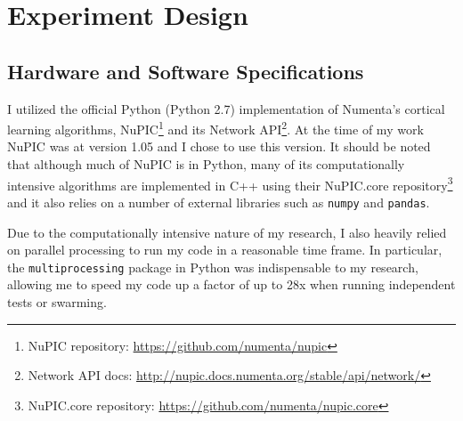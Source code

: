 \documentclass[oneside,12pt,openany]{book}
\begin{document}
	
	
    
    
    
    
    
	
	
	\chapter{Experiment Design}
	
	\section{Hardware and Software Specifications}
	
	I utilized the official Python (Python 2.7) implementation of Numenta's cortical learning algorithms, NuPIC\footnote{NuPIC repository: \href{https://github.com/numenta/nupic}{\ttfamily https://github.com/numenta/nupic} } and its Network API\footnote{Network API docs: \href{http://nupic.docs.numenta.org/stable/api/network/}{\ttfamily http://nupic.docs.numenta.org/stable/api/network/}}. At the time of my work NuPIC was at version 1.05 and I chose to use this version. It should be noted that although much of NuPIC is in Python, many of its computationally intensive algorithms are implemented in C++ using their NuPIC.core repository\footnote{NuPIC.core repository: \href{https://github.com/numenta/nupic.core}{\ttfamily https://github.com/numenta/nupic.core}} and it also relies on a number of external libraries such as \texttt{numpy} and \texttt{pandas}. 
	
	Due to the computationally intensive nature of my research, I also heavily relied on parallel processing to run my code in a reasonable time frame. In particular, the \texttt{multiprocessing} package in Python was indispensable to my research, allowing me to speed my code up a factor of up to 28x when running independent tests or swarming.
	
\end{document}
